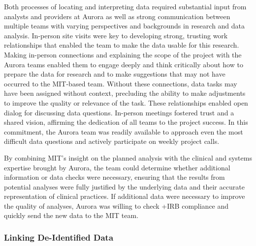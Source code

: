 \documentclass[
]{WileySix}
\begin{document}
Both processes of locating and interpreting data required substantial input from analysts and providers at Aurora as well as strong communication between multiple teams with varying perspectives and backgrounds in research and data analysis. In-person site visits were key to developing strong, trusting work relationships that enabled the team to make the data usable for this research. Making in-person connections and explaining the scope of the project with the Aurora teams enabled them to engage deeply and think critically about how to prepare the data for research and to make suggestions that may not have occurred to the MIT-based team. Without these connections, data tasks may have been assigned without context, precluding the ability to make adjustments to improve the quality or relevance of the task. These relationships enabled open dialog for discussing data questions. In-person meetings fostered trust and a shared vision, affirming the dedication of all teams to the project success. In this commitment, the Aurora team was readily available to approach even the most difficult data questions and actively participate on weekly project calls.

By combining MIT's insight on the planned analysis with the clinical and systems expertise brought by Aurora, the team could determine whether additional information or data checks were necessary, ensuring that the results from potential analyses were fully justified by the underlying data and their accurate representation of clinical practices. If additional data were necessary to improve the quality of analyses, Aurora was willing to check +IRB\textbar{} compliance and quickly send the new data to the MIT team.

\hypertarget{linking-de-identified-data}{%
\subsubsection{Linking De-Identified Data}\label{linking-de-identified-data}}
\end{document}
